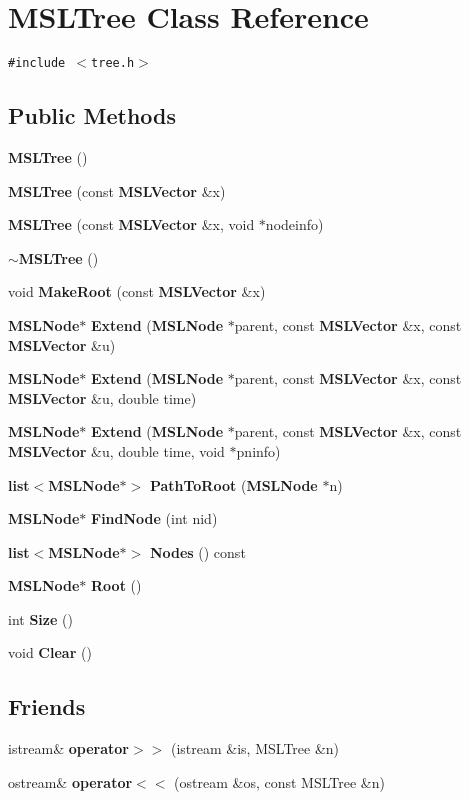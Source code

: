 \section{MSLTree  Class Reference}
\label{classMSLTree}
{\tt \#include $<$tree.h$>$}

\subsection*{Public Methods}
\begin{CompactItemize}
\item 
{\bf MSLTree} ()
\item 
{\bf MSLTree} (const {\bf MSLVector} \&x)
\item 
{\bf MSLTree} (const {\bf MSLVector} \&x, void $\ast$nodeinfo)
\item 
{\bf $\sim$MSLTree} ()
\item 
void {\bf Make\-Root} (const {\bf MSLVector} \&x)
\item 
{\bf MSLNode}$\ast$ {\bf Extend} ({\bf MSLNode} $\ast$parent, const {\bf MSLVector} \&x, const {\bf MSLVector} \&u)
\item 
{\bf MSLNode}$\ast$ {\bf Extend} ({\bf MSLNode} $\ast$parent, const {\bf MSLVector} \&x, const {\bf MSLVector} \&u, double time)
\item 
{\bf MSLNode}$\ast$ {\bf Extend} ({\bf MSLNode} $\ast$parent, const {\bf MSLVector} \&x, const {\bf MSLVector} \&u, double time, void $\ast$pninfo)
\item 
{\bf list}$<${\bf MSLNode}$\ast$$>$ {\bf Path\-To\-Root} ({\bf MSLNode} $\ast$n)
\item 
{\bf MSLNode}$\ast$ {\bf Find\-Node} (int nid)
\item 
{\bf list}$<${\bf MSLNode}$\ast$$>$ {\bf Nodes} () const
\item 
{\bf MSLNode}$\ast$ {\bf Root} ()
\item 
int {\bf Size} ()
\item 
void {\bf Clear} ()
\end{CompactItemize}
\subsection*{Friends}
\begin{CompactItemize}
\item 
istream\& {\bf operator$>$$>$} (istream \&is, MSLTree \&n)
\item 
ostream\& {\bf operator$<$$<$} (ostream \&os, const MSLTree \&n)
\end{CompactItemize}


